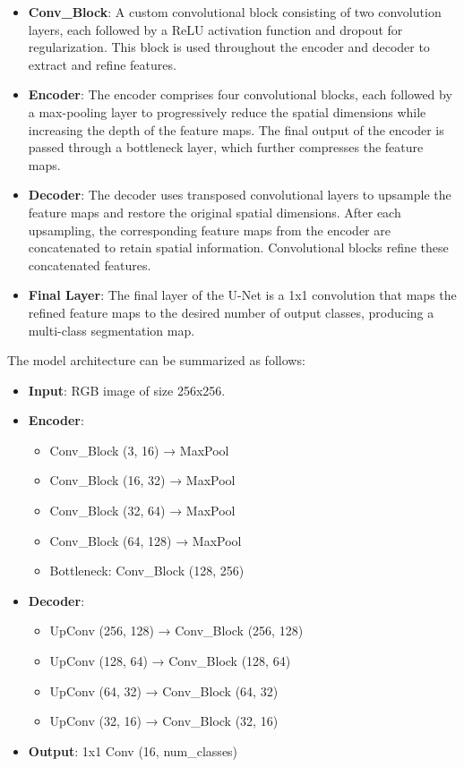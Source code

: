 \documentclass{article}
\begin{document}
\begin{itemize}
    \item \textbf{Conv\_Block}: A custom convolutional block consisting of two convolution layers, each followed by a ReLU activation function and dropout for regularization. This block is used throughout the encoder and decoder to extract and refine features.
    \item \textbf{Encoder}: The encoder comprises four convolutional blocks, each followed by a max-pooling layer to progressively reduce the spatial dimensions while increasing the depth of the feature maps. The final output of the encoder is passed through a bottleneck layer, which further compresses the feature maps.
    \item \textbf{Decoder}: The decoder uses transposed convolutional layers to upsample the feature maps and restore the original spatial dimensions. After each upsampling, the corresponding feature maps from the encoder are concatenated to retain spatial information. Convolutional blocks refine these concatenated features.
    \item \textbf{Final Layer}: The final layer of the U-Net is a 1x1 convolution that maps the refined feature maps to the desired number of output classes, producing a multi-class segmentation map.
\end{itemize}

The model architecture can be summarized as follows:

\begin{itemize}
    \item \textbf{Input}: RGB image of size 256x256.
    \item \textbf{Encoder}:
        \begin{itemize}
            \item Conv\_Block (3, 16) → MaxPool
            \item Conv\_Block (16, 32) → MaxPool
            \item Conv\_Block (32, 64) → MaxPool
            \item Conv\_Block (64, 128) → MaxPool
            \item Bottleneck: Conv\_Block (128, 256)
        \end{itemize}
    \item \textbf{Decoder}:
        \begin{itemize}
            \item UpConv (256, 128) → Conv\_Block (256, 128)
            \item UpConv (128, 64) → Conv\_Block (128, 64)
            \item UpConv (64, 32) → Conv\_Block (64, 32)
            \item UpConv (32, 16) → Conv\_Block (32, 16)
        \end{itemize}
    \item \textbf{Output}: 1x1 Conv (16, num\_classes)
\end{itemize}
\end{document}
